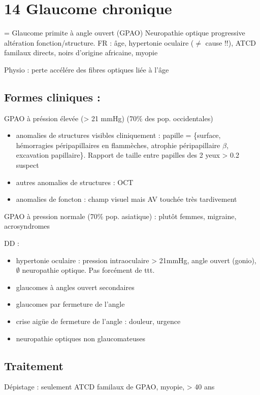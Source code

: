 \documentclass[11pt]{article}
\begin{document}
\section{14 Glaucome chronique}
\label{sec:org2cbc647}
= Glaucome primite à angle ouvert (GPAO) Neuropathie optique progressive altération
fonction/structure.
FR : âge, hypertonie oculaire (\(\ne\) cause !!), ATCD familaux directs, noirs
d'origine africaine, myopie

Physio : perte accélére des fibres optiques liée à l'âge

\subsection{Formes cliniques :}
\label{sec:org2bf8bfe}
GPAO à préssion élevée (> 21 mmHg) (70\% des pop. occidentales)
\begin{itemize}
\item anomalies de structures visibles cliniquement : papille = \{\dec surface,
hémorragies péripapillaires en flammèches, atrophie péripapillaire \(\beta\), \inc
excavation papillaire\}. Rapport de taille entre papilles des 2 yeux > 0.2
\thus suspect
\item autres anomalies de structures : OCT
\item anomalies de foncton : champ visuel mais AV touchée très tardivement
\end{itemize}

GPAO à pression normale (70\% pop. asiatique) : plutôt femmes, migraine, acrosyndromes

DD : 
\begin{itemize}
\item hypertonie oculaire : pression intraoculaire > 21mmHg, angle ouvert (gonio),
\(\emptyset\) neuropathie optique. Pas forcément de ttt.
\item glaucomes à angles ouvert secondaires
\item glaucomes par fermeture de l'angle
\item crise aigüe de fermeture de l'angle : douleur, urgence \skull
\item neuropathie optiques non glaucomateuses
\end{itemize}

\subsection{Traitement}
\label{sec:orgf6d3366}
Dépistage : seulement ATCD familaux de GPAO, myopie, > 40 ans
\end{document}

